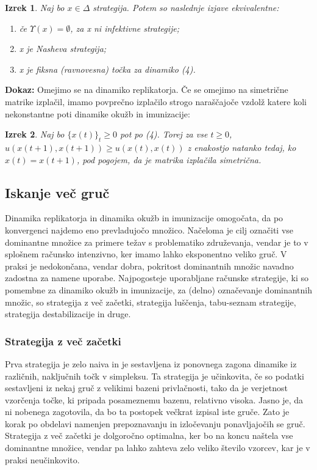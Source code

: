 \documentclass[a4paper]{article}
\newtheorem{theorem}{Izrek}
\begin{document}
\begin{theorem}
Naj bo $x \in\Delta$ strategija. Potem so naslednje izjave ekvivalentne: 
\begin{enumerate}
\item če $\Upsilon(x) = \emptyset$, za x ni infektivne strategije; 
\item x je Nasheva strategija; 
\item x je fiksna (ravnovesna) točka za dinamiko (4).
\end{enumerate}
\end{theorem}
\textbf{Dokaz:} Omejimo se na dinamiko replikatorja. Če se omejimo na simetrične matrike izplačil, imamo povprečno izplačilo strogo naraščajoče vzdolž katere koli nekonstantne poti dinamike okužb in imunizacije: 
\begin{theorem}
Naj bo $\{x(t)\}_t \geq 0$ pot po (4). Torej za vse $t \geq 0$, $u (x (t + 1), x (t + 1)) \geq u (x (t), x (t))$ z enakostjo natanko tedaj, ko $x (t) = x (t + 1)$, pod pogojem, da je matrika izplačila simetrična.
\end{theorem}

\subsection{Iskanje več gruč}
Dinamika replikatorja in dinamika okužb in imunizacije omogočata, da po konvergenci najdemo eno prevladujočo množico. Načeloma je cilj označiti vse dominantne množice za primere težav s problematiko združevanja, vendar je to v splošnem računsko intenzivno, ker imamo lahko eksponentno veliko gruč. V praksi je nedokončana, vendar dobra, pokritost dominantnih množic navadno zadostna za namene uporabe. Najpogosteje uporabljane računske strategije, ki so pomembne za dinamiko okužb in imunizacije, za (delno) označevanje dominantnih množic, so strategija z več začetki, strategija luščenja, tabu-seznam strategije, strategija destabilizacije in druge.

\subsubsection{Strategija z več začetki} Prva strategija je zelo naiva in je sestavljena iz ponovnega zagona dinamike iz različnih, naključnih točk v simpleksu. Ta strategija je učinkovita, če so podatki sestavljeni iz nekaj gruč z velikimi bazeni privlačnosti, tako da je verjetnost vzorčenja točke, ki pripada posameznemu bazenu, relativno visoka. Jasno je, da ni nobenega zagotovila, da bo ta postopek večkrat izpisal iste gruče. Zato je korak po obdelavi namenjen prepoznavanju in izločevanju ponavljajočih se gruč. Strategija z več začetki je dolgoročno optimalna, ker bo na koncu naštela vse dominantne množice, vendar pa lahko zahteva zelo veliko število vzorcev, kar je v praksi neučinkovito.
\end{document}
